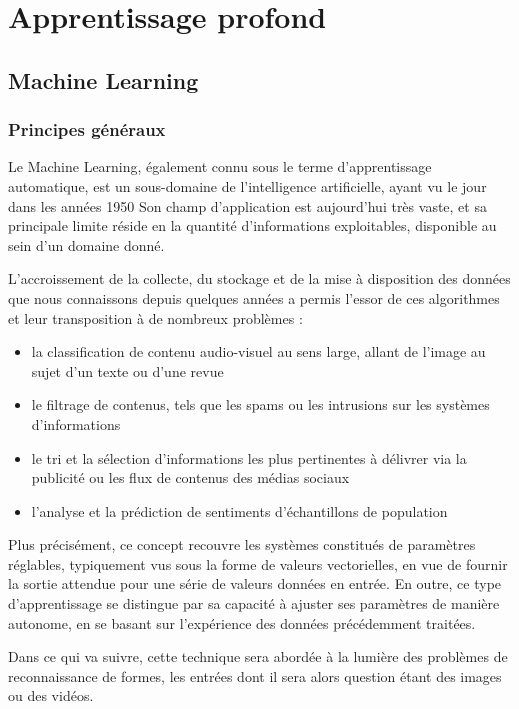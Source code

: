 \chapter{Apprentissage profond}

  \section{Machine Learning}

    \subsection{Principes généraux}

      Le Machine Learning, également connu sous le terme d'apprentissage automatique, est un sous-domaine de l'intelligence artificielle, ayant vu le jour dans
      les années 1950\cite{Bib_Marr}\cite{Bib_McCar}
      Son champ d'application est aujourd'hui très vaste, et sa principale limite réside en la quantité d'informations exploitables, disponible au sein d'un domaine donné.

      L'accroissement de la collecte, du stockage et de la mise à disposition des données que nous connaissons depuis quelques années a permis l'essor de ces algorithmes et leur transposition à de nombreux problèmes :

      \begin{itemize}
	\item la classification de contenu audio-visuel au sens large, allant de l'image au sujet d'un texte ou d'une revue
	\item le filtrage de contenus, tels que les spams ou les intrusions sur les systèmes d'informations
	\item le tri et la sélection d'informations les plus pertinentes à délivrer via la publicité ou les flux de contenus des médias sociaux
	\item l'analyse et la prédiction de sentiments d'échantillons de population 
      \end{itemize}

      Plus précisément, ce concept recouvre les systèmes constitués de paramètres réglables, typiquement vus sous la forme de
      valeurs vectorielles, en vue de fournir la sortie attendue pour une série de valeurs données en entrée. En outre, ce type d'apprentissage se distingue
      par sa capacité à ajuster ses paramètres de manière autonome, en se basant sur l'expérience des données précédemment traitées.

      Dans ce qui va suivre, cette technique sera abordée à la lumière des problèmes de reconnaissance de formes, les entrées dont il sera alors question étant des images ou des vidéos.

